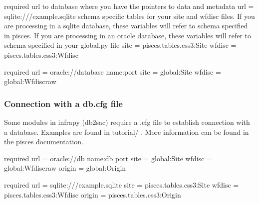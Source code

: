 \documentclass[letterpaper,10pt,english]{sphinxmanual}
\begin{document}

\begin{sphinxVerbatim}[commandchars=\\\{\}]
[database] \PYGZsh{} required
\PYGZsh{} url to database where you have the pointers to data and metadata
url = sqlite:///example.sqlite
\PYGZsh{} schema specific tables for your site and wfdisc files.  If you are processing in a sqlite database, these variables will refer to schema specified in pisces. If you are processing in an oracle database, these variables will refer to schema specified in your global\PYGZus{}.py file
site = pisces.tables.css3:Site
wfdisc = pisces.tables.css3:Wfdisc
\end{sphinxVerbatim}


\begin{sphinxVerbatim}[commandchars=\\\{\}]
[database] \PYGZsh{} required
url = oracle://\PYGZlt{}database name\PYGZgt{}:\PYGZlt{}port\PYGZgt{}
site = global\PYGZus{}:Site
wfdisc = global\PYGZus{}:Wfdisc\PYGZus{}raw
\end{sphinxVerbatim}


\subsubsection{Connection with a db.cfg file}
\label{\detokenize{pisces:connection-with-a-db-cfg-file}}
Some modules in infrapy (db2sac) require a .cfg file to establish connection with a database.  Examples are found in tutorial/ . More information can be found in the pisces documentation.


\begin{sphinxVerbatim}[commandchars=\\\{\}]
[database] \PYGZsh{} required
url = oracle://\PYGZlt{}db name\PYGZgt{}:\PYGZlt{}db port\PYGZgt{}
site = global\PYGZus{}:Site
wfdisc = global\PYGZus{}:Wfdisc\PYGZus{}raw
origin = global\PYGZus{}:Origin
\end{sphinxVerbatim}


\begin{sphinxVerbatim}[commandchars=\\\{\}]
[database] \PYGZsh{} required
url = sqlite:///example.sqlite
site = pisces.tables.css3:Site
wfdisc = pisces.tables.css3:Wfdisc
origin = pisces.tables.css3:Origin
\end{sphinxVerbatim}
\end{document}
